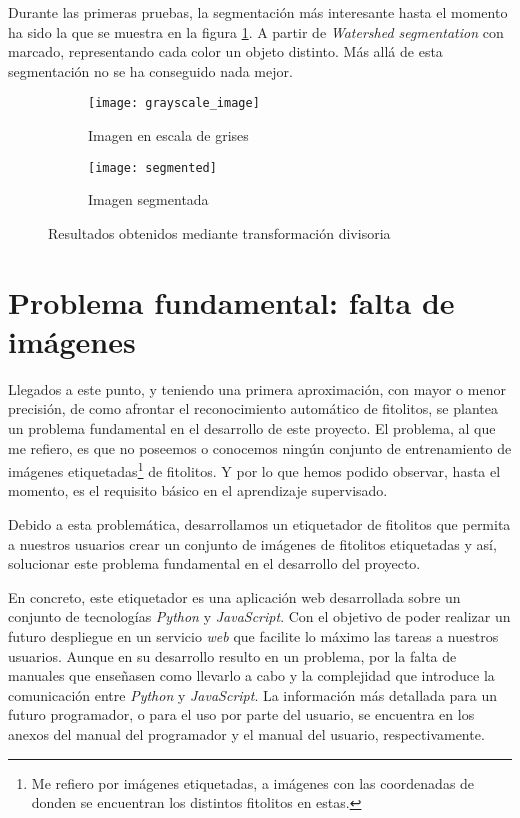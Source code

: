 Durante las primeras pruebas, la segmentación más interesante hasta el momento ha sido la que se muestra en la figura \ref{fig:5.1.3}. A partir de \textit{Watershed segmentation} con marcado, representando cada color un objeto distinto. Más allá de esta segmentación no se ha conseguido nada mejor.

\begin{figure}
	\centering
	\begin{subfigure}[b]{0.45\textwidth}
        \texttt{[image: grayscale\_image]}
        \caption{Imagen en escala de grises}
    \end{subfigure}
    \begin{subfigure}[b]{0.45\textwidth}
        \texttt{[image: segmented]}
        \caption{Imagen segmentada}
    \end{subfigure}
        \caption{Resultados obtenidos mediante transformación divisoria}
	\label{fig:5.1.3}
\end{figure} 	

\section{Problema fundamental: falta de imágenes}

Llegados a este punto, y teniendo una primera aproximación, con mayor o menor precisión, de como afrontar el reconocimiento automático de fitolitos, se plantea un problema fundamental en el desarrollo de este proyecto. El problema, al que me refiero, es que no poseemos o conocemos ningún conjunto de entrenamiento de imágenes etiquetadas\footnote{Me refiero por imágenes etiquetadas, a imágenes con las coordenadas de donden se encuentran los distintos fitolitos en estas.} de fitolitos. Y por lo que hemos podido observar, hasta el momento, es el requisito básico en el aprendizaje supervisado.

Debido a esta problemática, desarrollamos un etiquetador de fitolitos que permita a nuestros usuarios crear un conjunto de imágenes de fitolitos etiquetadas y así, solucionar este problema fundamental en el desarrollo del proyecto.

En concreto, este etiquetador es una aplicación web desarrollada sobre un conjunto de tecnologías \textit{Python} y \textit{JavaScript}. Con el objetivo de poder realizar un futuro despliegue en un servicio \textit{web} que facilite lo máximo las tareas a nuestros usuarios. Aunque en su desarrollo resulto en un problema, por la falta de manuales que enseñasen como llevarlo a cabo y la complejidad que introduce la comunicación entre \textit{Python} y \textit{JavaScript}. La información más detallada para un futuro programador, o para el uso por parte del usuario, se encuentra en los anexos del manual del programador y el manual del usuario, respectivamente.

